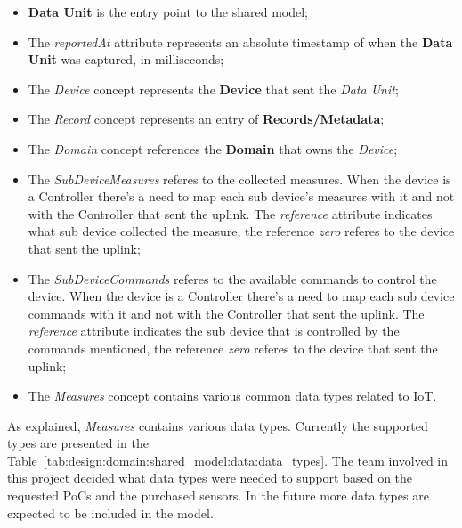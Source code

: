 \begin{itemize}
   \item \textbf{Data Unit} is the entry point to the shared model;
   \item The \textit{reportedAt} attribute represents an absolute timestamp of when the \textbf{Data Unit} was captured, in milliseconds;
   \item The \textit{Device} concept represents the \textbf{Device} that sent the \textit{Data Unit};
   \item The \textit{Record} concept represents an entry of \textbf{Records/Metadata};
   \item The \textit{Domain} concept references the \textbf{Domain} that owns the \textit{Device};
   \item The \textit{SubDeviceMeasures} referes to the collected measures. When the device is a Controller there's a need to map each sub device's measures with it and not with the Controller that sent the uplink. The \textit{reference} attribute indicates what sub device collected the measure, the reference \textit{zero} referes to the device that sent the uplink;
   \item The \textit{SubDeviceCommands} referes to the available commands to control the device. When the device is a Controller there's a need to map each sub device commands with it and not with the Controller that sent the uplink. The \textit{reference} attribute indicates the sub device that is controlled by the commands mentioned, the reference \textit{zero} referes to the device that sent the uplink;
   \item The \textit{Measures} concept contains various common data types related to \gls{IoT}.
\end{itemize}

As explained, \textit{Measures} contains various data types. Currently the supported types are presented in the Table~\ref{tab:design:domain:shared_model:data:data_types}. The team involved in this project decided what data types were needed to support based on the requested \gls{PoC}s and the purchased sensors. In the future more data types are expected to be included in the model.


